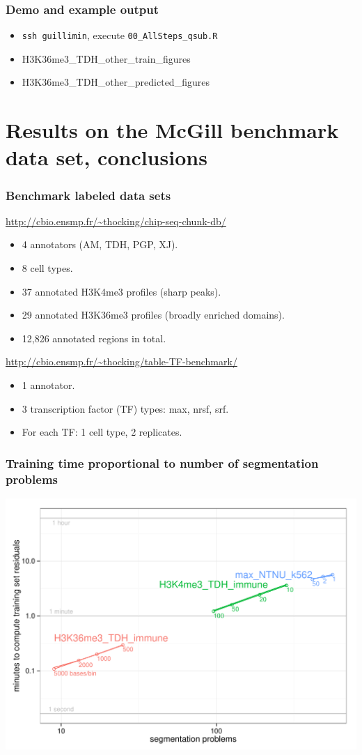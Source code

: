 \documentclass{beamer}
\begin{document}
\begin{frame}
  \frametitle{Demo and example output}
  \begin{itemize}
  \item \texttt{ssh guillimin}, execute \texttt{00\_AllSteps\_qsub.R}
  \item H3K36me3\_TDH\_other\_train\_figures
  \item H3K36me3\_TDH\_other\_predicted\_figures
  \end{itemize}
\end{frame}

\section{Results on the McGill benchmark data set, conclusions}

\begin{frame}
  \frametitle{Benchmark labeled data sets}
  \url{http://cbio.ensmp.fr/~thocking/chip-seq-chunk-db/}
  \begin{itemize}
  \item 4 annotators (AM, TDH, PGP, XJ).
  \item 8 cell types.
  \item 37 annotated H3K4me3 profiles (sharp peaks).
  \item 29 annotated H3K36me3 profiles (broadly enriched domains).
  \item 12,826 annotated regions in total.
  \end{itemize}

  \url{http://cbio.ensmp.fr/~thocking/table-TF-benchmark/}
  \begin{itemize}
  \item 1 annotator.
  \item 3 transcription factor (TF) types: max, nrsf, srf.
  \item For each TF: 1 cell type, 2 replicates.
  \end{itemize}
\end{frame}

\begin{frame}
  \frametitle{Training time proportional to 
    number of segmentation problems}
  \includegraphics[width=\textwidth]{figure-overlapping-feasible-timings}
\end{frame}
\end{document}
